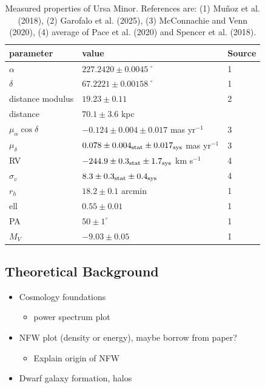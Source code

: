 \begin{table}[t]
\centering
\caption{Measured properties of Ursa Minor. References are: (1) Muñoz et al. (2018), (2) Garofalo et al. (2025), (3) McConnachie and Venn (2020), (4) average of Pace et al. (2020) and Spencer et al. (2018).}
\label{tbl:Measured-properties-of-Ursa-Minor-References-are:-1-Muñoz-et-al-2018-2-Garofalo-et-al-2025-3-McConnachie-and-Venn-2020-4-average-of-Pace-et-al-2020-and-Spencer-et-al-2018}
\begin{tabular}{lll}
\toprule
parameter & value & Source\\
\midrule
$\alpha$ & $ 227.2420 \pm 0.0045$˚ & 1\\
$\delta$ & $67.2221 \pm 0.00158$˚ & 1\\
distance modulus & $19.23 \pm 0.11$ & 2\\
distance & $70.1 \pm 3.6$ kpc & \\
$\mu_\alpha \cos \delta$ & $-0.124 \pm 0.004 \pm 0.017$ mas yr$^{-1}$ & 3\\
$\mu_\delta$ & $0.078 \pm 0.004_{\rm stat} \pm 0.017_{\rm sys}$ mas yr$^{-1}$ & 3\\
RV & $-244.9 \pm 0.3_{\rm stat} \pm 1.7_{\rm sys}$ km s$^{-1}$ & 4\\
$\sigma_v$ & $8.3 \pm 0.3_{\rm stat} \pm 0.4_{\rm sys}$ & 4\\
$r_h$ & $18.2 \pm 0.1$ arcmin & 1\\
ell & $0.55 \pm 0.01$ & 1\\
PA & $50 \pm 1^\circ$ & 1\\
$M_V$ & $-9.03 \pm 0.05$ & 1\\
\bottomrule
\end{tabular}
\end{table}

\subsection{Theoretical Background}\label{theoretical-background}

\begin{itemize}
\tightlist
\item
  Cosmology foundations

  \begin{itemize}
  \tightlist
  \item
    power spectrum plot
  \end{itemize}
\item
  NFW plot (density or energy), maybe borrow from paper?

  \begin{itemize}
  \tightlist
  \item
    Explain origin of NFW
  \end{itemize}
\item
  Dwarf galaxy formation, halos
\end{itemize}

